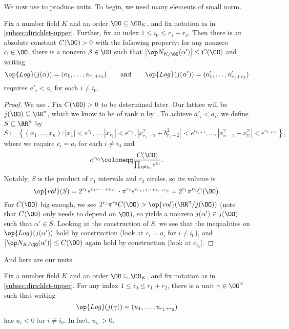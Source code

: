 \documentclass[../notes.tex]{subfiles}
\begin{document}
We now use  to produce units. To begin, we need many elements of small norm.
\begin{lemma} \label{lem:decrease-coords-bound-norm}
	Fix a number field $K$ and an order $\OO\subseteq\OO_K$, and fix notation as in \cref{subsec:dirichlet-upper}. Further, fix an index $1\le i_0\le r_1+r_2$. Then there is an absolute constant $C(\OO)>0$ with the following property: for any nonzero $\alpha\in\OO$, there is a nonzero $\beta\in\OO$ such that $\left|\op N_{K/\QQ}(\alpha')\right|\le C(\OO)$ and writing
	\[\op{Log}(j(\alpha))=(a_1,\ldots,a_{r_1+r_2})\qquad\text{and}\qquad\op{Log}(j(\alpha'))=(a'_1,\ldots,a'_{r_1+r_2})\]
	requires $a'_i<a_i$ for each $i\ne i_0$.
\end{lemma}
\begin{proof}
	We use . Fix $C(\OO)>0$ to be determined later. Our lattice will be $j(\OO)\subseteq\RR^n$, which we know to be of rank $n$ by . To achieve $a'_i<a_i$, we define $S\subseteq\RR^n$ by
	\[S\coloneqq\left\{(x_1,\ldots,x_n):\left|x_1\right|<e^{c_1},\ldots,\left|x_{r_1}\right|<e^{c_{r_1}},\left|x_{r_1+1}^2+b_{r_1+2}^2\right|<e^{c_{r_1+1}},\ldots,\left|x_{n-1}^2+x_n^2\right|<e^{c_{r_1+r_2}}\right\},\]
	where we require $c_i=a_i$ for each $i\ne i_0$ and
	\[e^{c_{i_0}}\coloneqq\frac{C(\OO)}{\prod_{i\ne i_0}e^{c_i}}.\]
	Notably, $S$ is the product of $r_1$ intervals and $r_2$ circles, so its volume is
	\[\op{vol}(S)=2^{r_1}e^{c_1+\cdots+c_{r_1}}\cdot\pi^{r_2}e^{c_{r_1+1}\cdots c_{r_1+r_2}}=2^{r_1}\pi^{r_2}C(\OO).\]
	For $C(\OO)$ big enough, we see $2^{r_1}\pi^{r_2}C(\OO)>\op{vol}(\RR^n/j(\OO))$ (note that $C(\OO)$ only needs to depend on $\OO$), so  yields a nonzero $j(\alpha')\in j(\OO)$ such that $\alpha'\in S$. Looking at the construction of $S$, we see that the inequalities on $\op{Log}(j(\alpha'))$ hold by construction (look at $c_i=a_i$ for $i\ne i_0$), and $\left|\op N_{K/\QQ}(\alpha')\right|\le C(\OO)$ again hold by construction (look at $c_{i_0}$).
\end{proof}
And here are our units.
\begin{lemma} \label{lem:special-negative-unit}
	Fix a number field $K$ and an order $\OO\subseteq\OO_K$, and fix notation as in \cref{subsec:dirichlet-upper}. For any index $1\le i_0\le r_1+r_2$, there is a unit $\gamma\in\OO^\times$ such that writing
	\[\op{Log}(j(\gamma))=(u_1,\ldots,u_{r_1+r_2})\]
	has $u_i<0$ for $i\ne i_0$. In fact, $u_{i_0}>0$.
\end{lemma}
\end{document}
